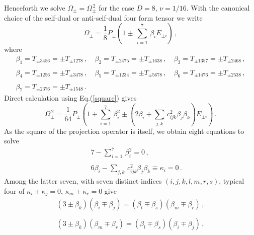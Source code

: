 \documentclass[a4paper,11pt]{article}
\newcommand{\const}{{\nu}}
\def\const{{\nu}}
\begin{document}
Henceforth  we solve  $\Omega_{\pm}=\Omega^{\,2}_{\pm}$ for the case $D=8$, $\const={1/16}$. With the canonical choice of  the self-dual or
anti-self-dual four form tensor  we write
\begin{equation}
\Omega_{\pm}=\displaystyle{\frac{1}{8}P_{\pm}\left(1\pm\,\sum_{i=1}^{7}\,\beta_{i}E_{\pm i}\right)}\,,
\end{equation}
where
\begin{equation}
\begin{array}{lll}
\beta_{1}=T_{\pm 3456}=\pm T_{\pm 1278}\,,~&\beta_{2}=T_{\pm 2475}=\pm T_{\pm 1638}\,,~&\beta_{3}=T_{\pm 1357}=\pm T_{\pm
2468}\,,\\{}&{}&{}\\ \beta_{4}=T_{\pm 1256}=\pm T_{\pm 3478}\,,~&\beta_{5}=T_{\pm 1234}=\pm T_{\pm
5678}\,,~&\beta_{6}=T_{\pm 1476}=\pm T_{\pm 2538}\,,\\{}&{}&{}\\ \beta_{7}=T_{\pm 2376}=\pm T_{\pm 1548}\,.&{}&{}
\end{array}
\label{beta}
\end{equation}
Direct calculation using Eq.(\ref{square}) gives
\begin{equation}
\Omega_{\pm}^{\,2}=\displaystyle{\frac{1}{64}}P_{\pm}\left( 1+\sum_{i=1}^7\,\beta_{i}^{2} \pm (2\beta_{i}+
\sum_{j,k}\, c^2_{ijk}\beta_{j}\beta_{k})E_{\pm i} \right)\,.
\end{equation}
As the square of the projection operator is itself, we obtain eight equations to solve
\begin{eqnarray}
&&7-\displaystyle{\sum_{i=1}^{7}}\,\beta_{i}^{2}=0\,,\label{saturation}\\ {}\nonumber\\ &&
6\beta_{i}-\displaystyle{\sum_{j,k}\,}c^2_{ijk}\beta_{j}\beta_{k}\equiv\kappa_{i}=0\,.\label{seven}
\end{eqnarray}
Among the latter seven, with seven distinct indices $(i,j,k,l,m,r,s)$, typical four of ${\kappa_{i}\pm\kappa_{j}=0}$, ${\kappa_{m}\pm\kappa_{r}=0}$
give
\begin{equation}
\begin{array}{l}
(3\pm\beta_{k})(\beta_{i}\mp\beta_{j})=(\beta_{l}\mp\beta_{s})(\beta_{m}\mp\beta_{r})\,,\\{}\\
(3\pm\beta_{k})(\beta_{m}\mp\beta_{r})=(\beta_{l}\mp\beta_{s})(\beta_{i}\mp\beta_{j})\,,
\end{array}
\end{equation}
\end{document}
